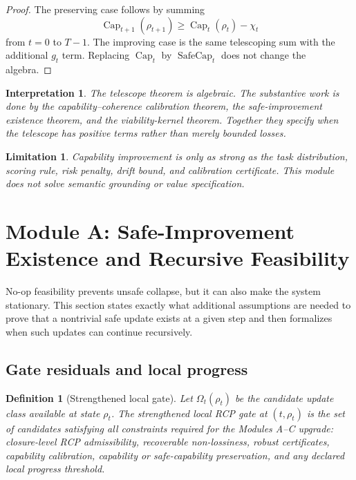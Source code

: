 \documentclass[11pt]{article}
\newtheorem{definition}[theorem]{Definition}
\newtheorem{interpretation}[theorem]{Interpretation}
\newtheorem{limitation}[theorem]{Limitation}
\newcommand{\1}{\mathbf{1}}
\renewcommand{\Cap}{\operatorname{Cap}}
\providecommand{\SafeCap}{\operatorname{SafeCap}}
\begin{document}
\begin{proof}
The preserving case follows by summing
\[
\Cap_{t+1}(\rho_{t+1})
\ge
\Cap_t(\rho_t)-\chi_t
\]
from \(t=0\) to \(T-1\).  The improving case is the same telescoping sum with the additional \(g_t\) term.  Replacing \(\Cap_t\) by \(\SafeCap_t\) does not change the algebra.
\end{proof}

\begin{interpretation}
The telescope theorem is algebraic.  The substantive work is done by the capability--coherence calibration theorem, the safe-improvement existence theorem, and the viability-kernel theorem.  Together they specify when the telescope has positive terms rather than merely bounded losses.
\end{interpretation}

\begin{limitation}
Capability improvement is only as strong as the task distribution, scoring rule, risk penalty, drift bound, and calibration certificate.  This module does not solve semantic grounding or value specification.
\end{limitation}

\section{Module A: Safe-Improvement Existence and Recursive Feasibility}
\label{sec:safe_improvement_existence}

No-op feasibility prevents unsafe collapse, but it can also make the system stationary.  This section states exactly what additional assumptions are needed to prove that a nontrivial safe update exists at a given step and then formalizes when such updates can continue recursively.

\subsection{Gate residuals and local progress}

\begin{definition}[Strengthened local gate]
Let \(\Omega_t(\rho_t)\) be the candidate update class available at state \(\rho_t\).  The strengthened local RCP gate at \((t,\rho_t)\) is the set of candidates satisfying all constraints required for the Modules A--C upgrade: closure-level RCP admissibility, recoverable non-lossiness, robust certificates, capability calibration, capability or safe-capability preservation, and any declared local progress threshold.
\end{definition}
\end{document}
